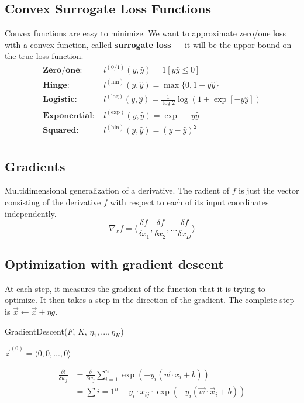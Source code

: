 \documentclass[a4paper,6pt,twocolumn,fleqn]{article}
\begin{document}
\subsection{Convex Surrogate Loss Functions} %
Convex functions are easy to minimize. We want to approximate zero/one loss with a convex function, called \textbf{surrogate loss} --- it will be the uppor bound on the true loss function.
\begin{align}
    \textbf{Zero/one: } &l^{(0/1)}(y, \hat y) = 1 [y \hat y \leq 0] \\
    \textbf{Hinge: } &l^{(\text{hin})}(y, \hat y) = \max \{0, 1 - y \hat y\} \\
    \textbf{Logistic: } &l^{(\text{log})}(y, \hat y) = \frac 1 {\log 2} \log (1 + \exp [-y \hat y]) \\
    \textbf{Exponential: } &l^{(\text{exp})}(y, \hat y) =  \exp [-y \hat y]\\
    \textbf{Squared: } &l^{(\text{hin})}(y, \hat y) = (y - \hat y)^2 \\
\end{align}
\subsection{Gradients} %
Multidimensional generalization of a derivative. The radient of \(f\) is just the vector consisting of the derivative \(f\) with respect to each of its input coordinates independently.
\begin{equation}
    \nabla_x f = \langle \frac {\delta f} {\delta x_1}, \frac {\delta f} {\delta x_2}, \ldots \frac {\delta f} {\delta x_D} \rangle
\end{equation}
\subsection{Optimization with gradient descent} %
At each step, it measures the gradient of the function that it is trying to optimize. It then takes a step in the direction of the gradient. The complete step is \(\vec x \gets \vec x + \eta g \).

\begin{algorithm}
    \caption{GradientDescent($F$, $K$, $\eta_1, ..., \eta_K$)}
    \label{alg:gradient_descent}
$\vec{z}^{(0)} = \langle 0,0,...,0 \rangle $\;
\end{algorithm}
\begin{align}
    \frac {\delta l} {\delta w_j} &= \frac \delta {\delta w_j} \sum_{i=1}^n \exp (-y_i (\vec w \cdot x_i + b)) \\
    & = \sum{i=1}^n -y_i \cdot x_{ij} \cdot \exp (-y_i (\vec w \cdot \vec x_i + b))
\end{align}
\end{document}
